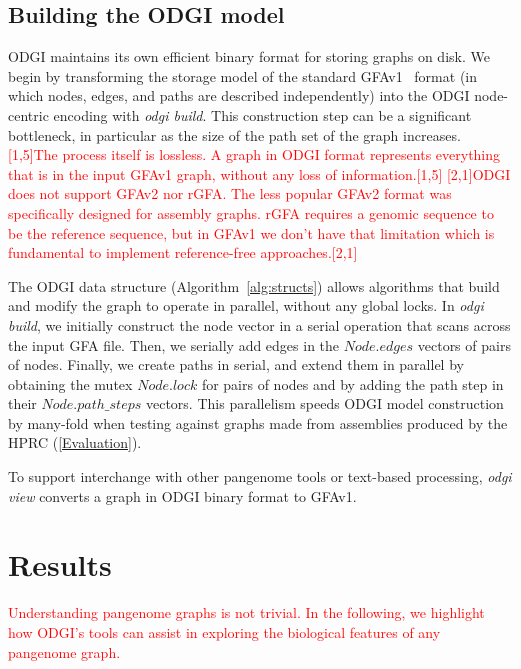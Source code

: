 \documentclass{bioinfo}
\newcommand{\REVIEWED}[1]{{\textcolor{Red}{#1}}}
\begin{document}
\subsection{Building the \textsc{ODGI} model}
\label{sec:build}
ODGI maintains its own efficient binary format for storing graphs on disk.
We begin by transforming the storage model of the standard GFAv1~\citep{GFA} format (in which nodes, edges, and paths are described independently) into the ODGI node-centric encoding with \textit{odgi build}.
This construction step can be a significant bottleneck, in particular as the size of the path set of the graph increases. \REVIEWED{[1,5]The process itself is lossless. A graph in ODGI format represents everything that is in the input GFAv1 graph, without any loss of information.[1,5]} \REVIEWED{[2,1]ODGI does not support GFAv2 nor rGFA. The less popular GFAv2 format was specifically designed for assembly graphs. rGFA requires a genomic sequence to be the reference sequence, but in GFAv1 we don't have that limitation which is fundamental to implement reference-free approaches.[2,1]}

The ODGI data structure (Algorithm~\ref{alg:structs}) allows algorithms that build and modify the graph to operate in parallel, without any global locks.
In \textit{odgi build}, we initially construct the node vector in a serial operation that scans across the input GFA file.
Then, we serially add edges in the $Node.edges$ vectors of pairs of nodes.
Finally, we create paths in serial, and extend them in parallel by obtaining the mutex $Node.lock$ for pairs of nodes and by adding the path step in their $Node.path\_steps$ vectors.
This parallelism speeds ODGI model construction by many-fold when testing against graphs made from assemblies produced by the HPRC (\autoref{Evaluation}).

To support interchange with other pangenome tools or text-based processing, \textit{odgi view} converts a graph in ODGI binary format to GFAv1.

\section{Results}

\REVIEWED{Understanding pangenome graphs is not trivial. In the following, we highlight how ODGI's tools can assist in exploring the biological features of any pangenome graph.}
\end{document}
